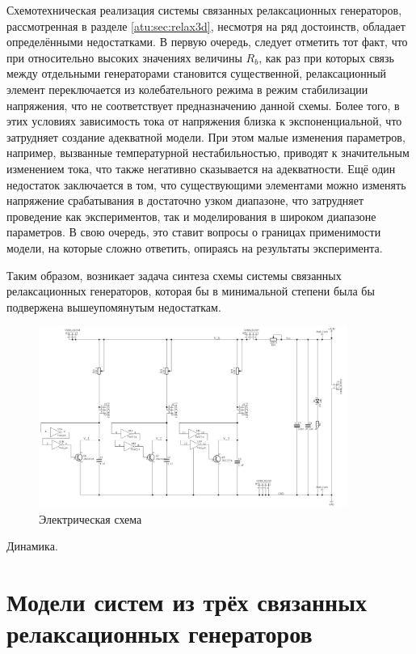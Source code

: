 Схемотехническая реализация системы связанных релаксационных генераторов,
рассмотренная в разделе \ref{atu:sec:relax3d}, несмотря на ряд достоинств,
обладает определёнными недостатками. В первую очередь, следует отметить
тот факт, что при относительно высоких значениях величины $R_b$,
как раз при которых связь между отдельными генераторами становится существенной,
релаксационный элемент переключается из колебательного режима в режим
стабилизации напряжения, что не соответствует предназначению данной схемы.
Более того, в этих условиях зависимость тока от напряжения близка к экспоненциальной,
что затрудняет создание адекватной модели. При этом малые изменения параметров,
например, вызванные температурной нестабильностью, приводят к значительным изменением
тока, что также негативно сказывается на адекватности. Ещё один недостаток
заключается в том, что существующими элементами можно изменять напряжение срабатывания
в достаточно узком диапазоне, что затрудняет проведение как экспериментов,
так и моделирования в широком диапазоне параметров. В свою очередь,
это ставит вопросы о границах применимости модели, на которые сложно
ответить, опираясь на результаты эксперимента.

Таким образом, возникает задача синтеза схемы системы связанных
релаксационных генераторов, которая бы в минимальной степени была бы
подвержена вышеупомянутым недостаткам.



\begin{figure}[htb!]
  \centerline{\includegraphics[width=0.9\textwidth]{p/relax3ds_schem.png} }
  \caption{Электрическая схема \RelaxShIi}
  \label{atu:f:relax3ds_schem}
\end{figure}


Динамика.

\section{Модели систем из трёх связанных релаксационных генераторов}

